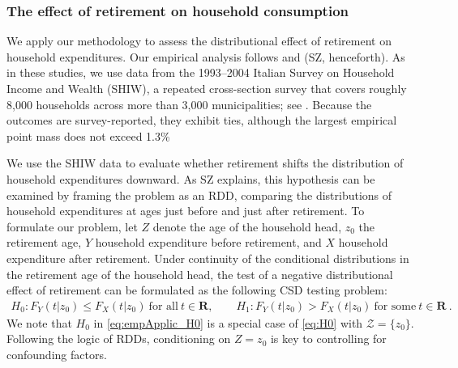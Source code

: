 \documentclass[11pt]{article}
\numberwithin{equation}{section}
\begin{document}
\subsubsection{The effect of retirement on household consumption}
We apply our methodology to assess the distributional effect of retirement on household expenditures. Our empirical analysis follows \citet{battistin/Brugianivi/Rettore/Weber:2009} and \cite{shen/zhang:16} (SZ, henceforth). As in these studies, we use data from the 1993--2004 Italian Survey on Household Income and Wealth (SHIW), a repeated cross-section survey that covers roughly 8,000 households across more than 3,000 municipalities; see \cite{shen/zhang:2016data}. Because the outcomes are survey-reported, they exhibit ties, although the largest empirical point mass does not exceed 1.3\%

We use the SHIW data to evaluate whether retirement shifts the distribution of household expenditures downward. As SZ explains, this hypothesis can be examined by framing the problem as an RDD, comparing the distributions of household expenditures at ages just before and just after retirement. To formulate our problem, let $Z$ denote the age of the household head, $z_0$ the retirement age, $Y$ household expenditure before retirement, and $X$ household expenditure after retirement. Under continuity of the conditional distributions in the retirement age of the household head, the test of a negative distributional effect of retirement can be formulated as the following CSD testing problem:
\begin{align}
H_0 : F_{Y}(t|z_0)\le F_{X}(t|z_0)~\text{for all}~ t \in \mathbf{R},\qquad
H_1:F_{Y}(t|z_0)> F_{X}(t|z_0)~\text{for some}~ t \in \mathbf{R}~.
\label{eq:empApplic_H0}
\end{align}
We note that $H_0$ in \eqref{eq:empApplic_H0} is a special case of \eqref{eq:H0} with $\mathcal{Z} = \{z_0\}$. Following the logic of RDDs, conditioning on $Z = z_0$ is key to controlling for confounding factors.
\end{document}

